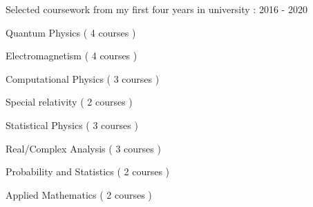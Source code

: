

\begin{cventries}

  \cventry
    {Selected coursework from my first four years in university : } %
    {} %
    {} %
    {2016 - 2020} %
    {
      \begin{cvitems} %
        \item {Quantum Physics ( 4 courses )}
        \item {Electromagnetism ( 4 courses )}
        \item {Computational Physics ( 3 courses )}
        \item {Special relativity ( 2 courses )}
        \item {Statistical Physics ( 3 courses )}
        \item {Real/Complex Analysis ( 3 courses )}
        \item {Probability and Statistics ( 2 courses )}
        \item {Applied Mathematics ( 2 courses )} 
      \end{cvitems}
    }

\end{cventries}
